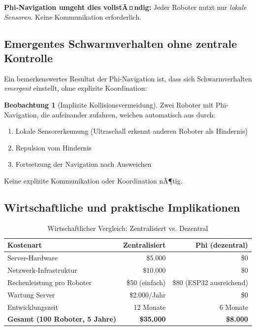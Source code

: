 ﻿\documentclass[a4paper,12pt]{article}
\theoremstyle{definition}
\newtheorem{beobachtung}{Beobachtung}
\begin{document}
\textbf{Phi-Navigation umgeht dies vollstÃ¤ndig:} Jeder Roboter nutzt nur \emph{lokale Sensoren}. Keine Kommunikation erforderlich.

\subsection{Emergentes Schwarmverhalten ohne zentrale Kontrolle}

Ein bemerkenswertes Resultat der Phi-Navigation ist, dass sich Schwarmverhalten \emph{emergent} einstellt, ohne explizite Koordination:

\begin{beobachtung}[Implizite Kollisionsvermeidung]
	Zwei Roboter mit Phi-Navigation, die aufeinander zufahren, weichen automatisch aus durch:
	\begin{enumerate}
		\item Lokale Sensorerkennung (Ultraschall erkennt anderen Roboter als Hindernis)
		\item Repulsion vom Hindernis
		\item Fortsetzung der Navigation nach Ausweichen
	\end{enumerate}
	Keine explizite Kommunikation oder Koordination nÃ¶tig.
\end{beobachtung}

\subsection{Wirtschaftliche und praktische Implikationen}

\begin{table}[H]
	\centering
	\caption{Wirtschaftlicher Vergleich: Zentralisiert vs. Dezentral}
	\label{tab:economic}
	\begin{tabular}{lrr}
		\toprule
		\textbf{Kostenart} & \textbf{Zentralisiert} & \textbf{Phi (dezentral)} \\
		\midrule
		Server-Hardware & \$5.000 & \$0 \\
		Netzwerk-Infrastruktur & \$10.000 & \$0 \\
		Rechenleistung pro Roboter & \$50 (einfach) & \$80 (ESP32 ausreichend) \\
		Wartung Server & \$2.000/Jahr & \$0 \\
		Entwicklungszeit & 12 Monate & 6 Monate \\
		\midrule
		\textbf{Gesamt (100 Roboter, 5 Jahre)} & \textbf{\$35.000} & \textbf{\$8.000} \\
		\bottomrule
	\end{tabular}
\end{table}
\end{document}
